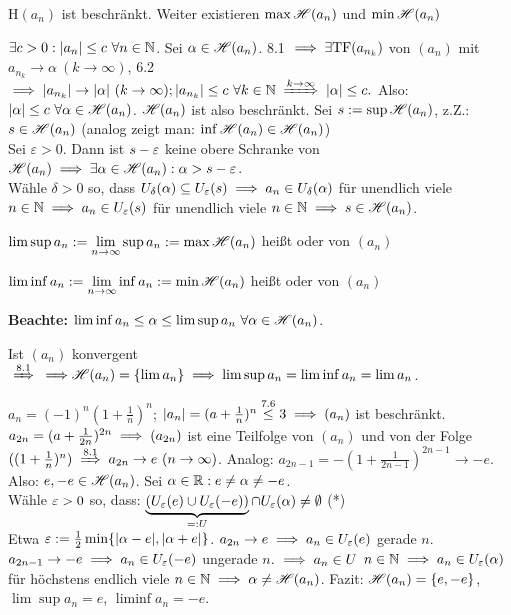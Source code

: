 \documentclass[a4paper,twoside,DIV15,BCOR12mm]{scrbook}
\begin{document}
\begin{satz}
H$(a_n)$ ist beschränkt. Weiter existieren $\max \mathscr{H}(a_n)$ und $\min \mathscr{H}(a_n)$
\end{satz}
\begin{beweis}
$\exists c>0: |a_n| \le c \ \forall n\in\mathbb{N}$. Sei $\alpha \in \mathscr{H}(a_n)$. 8.1 $\implies \exists \text{TF}(a_{n_k})$ von $(a_n)$ mit $a_{n_k} \to \alpha\ (k\to\infty)$, 6.2 $\folgt |a_{n_k}| \to |\alpha| \ (k\to\infty); |a_{n_k}| \le c \ \forall k \in\MdN \folgtwegen{k\to\infty} |\alpha| \le c.$
Also: $|\alpha| \le c  \ \forall \alpha \in \mathscr{H}(a_n)$. $\mathscr{H}(a_n)$ ist also beschränkt. Sei $s:=\sup\mathscr{H}(a_n)$, z.Z.: $s\in\mathscr{H}(a_n)$ (analog zeigt man: $\inf\mathscr{H}(a_n) \in \mathscr{H}(a_n)$) \\
Sei $\varepsilon > 0$. Dann ist $s-\varepsilon$ keine obere Schranke von $\mathscr{H}(a_n) \implies \exists \alpha \in \mathscr{H}(a_n): \alpha > s - \varepsilon$.\\
Wähle $\delta > 0$ so, dass $U_\delta(\alpha) \subseteq U_\varepsilon(s) \implies a_n \in U_\delta(\alpha)$ für unendlich viele $n\in\mathbb{N} \implies a_n\in U_\varepsilon(s)$ für unendlich viele $n\in\mathbb{N} \implies s \in \mathscr{H}(a_n)$.
\end{beweis}

\begin{definition}
$\displaystyle\limsup a_n := \lim_{n\to\infty}\sup a_n := \max\mathscr{H}(a_n)$ heißt  oder  von $(a_n)$

$\displaystyle\liminf a_n := \lim_{n\to\infty}\inf a_n := \min\mathscr{H}(a_n)$ heißt  oder  von $(a_n)$
\end{definition}

\textbf{Beachte:} $\liminf a_n \le \alpha \le \limsup a_n \ \forall \alpha \in\mathscr{H}(a_n)$.

\begin{beispiele}
\item Ist $(a_n)$ konvergent $\folgtwegen{8.1}{\folgt} \H(a_n) = \{\lim a_n\} \folgt \limsup a_n = \liminf a_n = \lim a_n$.
\item $a_n = (-1)^n(1+\frac{1}{n})^n$; $|a_n| = (a+\frac{1}{n})^n \stackrel{\text{7.6}}{\le} 3 \implies (a_n)$ ist beschränkt. \\
$a_{2n} = (a + \frac{1}{2n})^{2n} \implies (a_{2n})$ ist eine Teilfolge von $(a_n)$ und von der Folge $((1+\frac{1}{n})^n)  \folgtnach{8.1} a_{2n} \to e \ (n\to\infty)$. Analog: $a_{2n-1} = -(1 + \frac{1}{2n-1})^{2n-1} \to -e $. Also: $e, -e \in \mathscr{H}(a_n)$. Sei $\alpha \in \mathbb{R}: e \ne \alpha \ne -e$.\\
Wähle $\varepsilon > 0$ so, dass: $\displaystyle\underbrace{(U_\varepsilon(e) \cup U_\varepsilon(-e))}_{=:U} \cap U_\varepsilon(\alpha) \ne \emptyset$ (*)\\
Etwa $\varepsilon := \frac{1}{2} \min\{|\alpha-e|, |\alpha+e|\}$. $a_{2n} \to e \implies a_n \in U_\varepsilon(e)$ \ffa gerade $n$. $a_{2n-1} \to -e \implies a_n\in U_\varepsilon(-e)$ \ffa ungerade $n$. $\implies a_n \in U$ \ffa $n\in\mathbb{N} \implies a_n\in U_\varepsilon(\alpha)$ für höchstens endlich viele $n\in\mathbb{N} \implies \alpha \ne \mathscr{H}(a_n)$. Fazit: $\mathscr{H}(a_n) = \{e, -e\}$, $\lim\sup a_n=e$, $\liminf a_n = -e$.
\end{beispiele}
\end{document}
